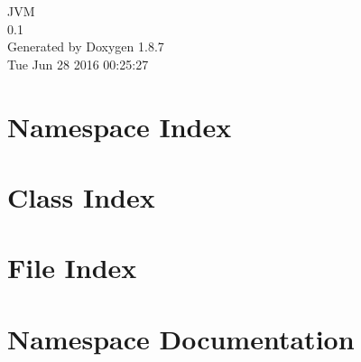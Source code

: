 \documentclass[twoside]{book}
\newcommand{\+}{\discretionary{\mbox{\scriptsize$\hookleftarrow$}}{}{}}
\newcommand{\clearemptydoublepage}{%
  \newpage{\pagestyle{empty}\cleardoublepage}%
}
\begin{document}
\hypersetup{pageanchor=false,
             bookmarks=true,
             bookmarksnumbered=true,
             pdfencoding=unicode
            }
\begin{titlepage}
\vspace*{7cm}
\begin{center}%
{\Large J\+V\+M \\[1ex]\large 0.\+1 }\\
\vspace*{1cm}
{\large Generated by Doxygen 1.8.7}\\
\vspace*{0.5cm}
{\small Tue Jun 28 2016 00:25:27}\\
\end{center}
\end{titlepage}
\clearemptydoublepage
\tableofcontents
\clearemptydoublepage
{}
\hypersetup{pageanchor=true}

\chapter{Namespace Index}

\chapter{Class Index}

\chapter{File Index}

\chapter{Namespace Documentation}

\end{document}
